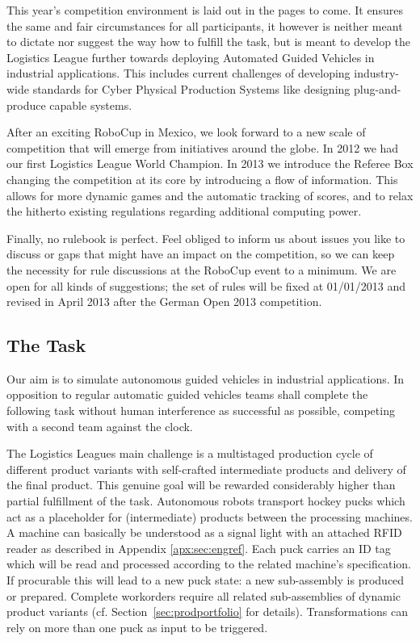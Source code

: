 \documentclass[12pt,twoside]{article}
\newcommand{\refsec}[1]{Section~\ref{#1}}
\begin{document}
This year's competition environment is laid out in the pages to come.
It ensures the same and fair circumstances for all participants, it
however is neither meant to dictate nor suggest the way how to fulfill
the task, but is meant to develop the Logistics League further towards deploying
Automated Guided Vehicles in industrial applications. This includes current
challenges of developing industry-wide standards for Cyber Physical Production
Systems like designing plug-and-produce capable systems.

After an exciting RoboCup in Mexico, we look forward to a new scale of
competition that will emerge from initiatives around the globe. In
2012 we had our first Logistics League World Champion.  In 2013 we
introduce the Referee Box changing the competition at its core by
introducing a flow of information.  This allows for more dynamic games
and the automatic tracking of scores, and to relax the hitherto
existing regulations regarding additional computing power.

Finally, no rulebook is perfect. Feel obliged to inform us about
issues you like to discuss or gaps that might have an impact on the
competition, so we can keep the necessity for rule discussions at the
RoboCup event to a minimum. We are open for all kinds of suggestions;
the set of rules will be fixed at 01/01/2013 and revised in April 2013
after the German Open 2013 competition.

\subsection{The Task}
\label{sec:task}

Our aim is to simulate autonomous guided vehicles in industrial
applications. In opposition to regular automatic guided vehicles teams
shall complete the following task without human interference as
successful as possible, competing with a second team against the clock.

The Logistics Leagues main challenge is a multistaged production cycle
of different product variants with self-crafted intermediate products
and delivery of the final product. This genuine goal will be
rewarded considerably higher than partial fulfillment of the task.
Autonomous robots transport hockey pucks which act as a placeholder for
(intermediate) products between the processing machines. A machine can
basically be understood as a signal light with an attached RFID reader
as described in Appendix \ref{apx:sec:engref}. Each puck carries an ID
tag which will be read and processed according to the related machine's
specification. If procurable this will lead to a new puck state: a new
sub-assembly is produced or prepared. Complete workorders require all
related sub-assemblies of dynamic product variants (cf.
\refsec{sec:prodportfolio} for details). Transformations can rely on
more than one puck as input to be triggered.
\end{document}
